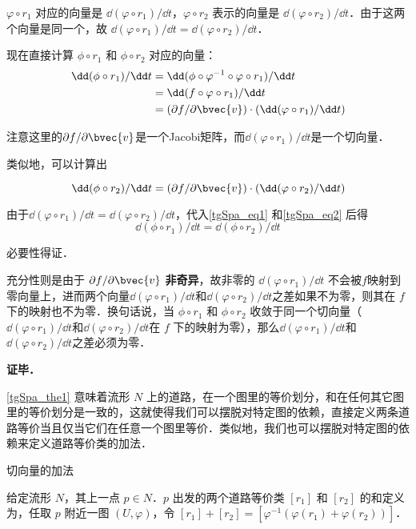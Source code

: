 $\varphi\circ r_1$ 对应的向量是 $\dd(\varphi\circ r_1)/\dd t$，$\varphi\circ r_2$ 表示的向量是 $\dd(\varphi\circ r_2)/\dd t$．由于这两个向量是同一个，故 $\dd(\varphi\circ r_1)/\dd t=\dd(\varphi\circ r_2)/\dd t$．

现在直接计算 $\phi\circ r_1$ 和 $\phi\circ r_2$ 对应的向量：
\begin{equation}\label{tgSpa_eq1}
\begin{aligned}
\dd(\phi\circ r_1)/\dd t&=\dd(\phi\circ\varphi^{-1}\circ\varphi\circ r_1)/\dd t\\
&=\dd(f\circ\varphi\circ r_1)/\dd t\\
&=(\partial f/\partial\bvec{v})\cdot(\dd(\varphi\circ r_1)/\dd t)
\end{aligned}
\end{equation}

注意这里的$\partial f/\partial\bvec{v}$是一个Jacobi矩阵，而$\dd(\varphi\circ r_1)/\dd t$是一个切向量．

类似地，可以计算出

\begin{equation}\label{tgSpa_eq2}
\dd(\phi\circ r_2)/\dd t=(\partial f/\partial\bvec{v})\cdot(\dd(\varphi\circ r_2)/\dd t)
\end{equation}

由于$\dd(\varphi\circ r_1)/\dd t=\dd(\varphi\circ r_2)/\dd t$，代入\autoref{tgSpa_eq1} 和\autoref{tgSpa_eq2} 后得
\begin{equation}
\dd(\phi\circ r_1)/\dd t=\dd(\phi\circ r_2)/\dd t
\end{equation}

必要性得证．

充分性则是由于 $\partial f/\partial\bvec{v}$ \textbf{非奇异}，故非零的 $\dd(\varphi\circ r_1)/\dd t$ 不会被$f$映射到零向量上，进而两个向量$\dd(\varphi\circ r_1)/\dd t$和$\dd(\varphi\circ r_2)/\dd t$之差如果不为零，则其在 $f$ 下的映射也不为零．换句话说，当 $\phi\circ r_1$ 和 $\phi\circ r_2$ 收敛于同一个切向量（$\dd(\varphi\circ r_1)/\dd t$和$\dd(\varphi\circ r_2)/\dd t$在 $f$ 下的映射为零），那么$\dd(\varphi\circ r_1)/\dd t$和$\dd(\varphi\circ r_2)/\dd t$之差必须为零．


\textbf{证毕．}

\autoref{tgSpa_the1} 意味着流形 $N$ 上的道路，在一个图里的等价划分，和在任何其它图里的等价划分是一致的，这就使得我们可以摆脱对特定图的依赖，直接定义两条道路等价当且仅当它们在任意一个图里等价．类似地，我们也可以摆脱对特定图的依赖来定义道路等价类的加法．

\begin{definition}{切向量的加法}\label{tgSpa_def1}

给定流形 $N$，其上一点 $p\in N$．$p$ 出发的两个道路等价类 $[r_1]$ 和 $[r_2]$ 的和定义为，任取 $p$ 附近一图 $(U, \varphi)$，令 $[r_1]+[r_2]=[\varphi^{-1}(\varphi(r_1)+\varphi(r_2))]$．

\end{definition}

